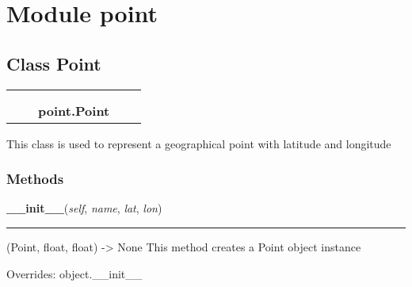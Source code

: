 %
%
%


\section{Module point}

    \label{point}


\subsection{Class Point}

    \label{point:Point}
\begin{tabular}{cccccc}
\multicolumn{2}{r}{\settowidth{\BCL}{object}\multirow{2}{\BCL}{object}}
&&
  \\\cline{3-3}
  &&\multicolumn{1}{c|}{}
&&
  \\
&&\multicolumn{2}{l}{\textbf{point.Point}}
\end{tabular}

This class is used to represent a geographical point with latitude and 
longitude



  \subsubsection{Methods}

    \vspace{0.5ex}

\hspace{.8\funcindent}\begin{boxedminipage}{\funcwidth}

    \raggedright \textbf{\_\_init\_\_}(\textit{self}, \textit{name}, \textit{lat}, \textit{lon})

    \vspace{-1.5ex}

    \rule{\textwidth}{0.5\fboxrule}
\setlength{\parskip}{2ex}
    (Point, float, float) -{\textgreater} None This method creates a Point 
    object instance

\setlength{\parskip}{1ex}
      Overrides: object.\_\_init\_\_

    \end{boxedminipage}

